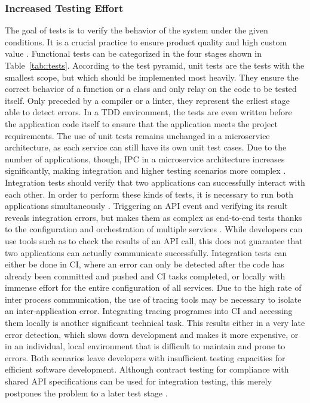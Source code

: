         \subsubsection{Increased Testing Effort}\label{sss::testing_problem}
        The goal of tests is to verify the behavior of the system under the given conditions. It is a crucial practice to ensure product quality and high custom value \cite{azuredevops}. Functional tests can be categorized in the four stages shown in Table~\ref{tab::tests}. According to the test pyramid, unit tests are the tests with the smallest scope, but which should be implemented most heavily. They ensure the correct behavior of a function or a class and only relay on the code to be tested itself. Only preceded by a compiler or a linter, they represent the erliest stage able to detect errors. In a \ac{TDD} environment, the tests are even written before the application code itself to ensure that the application meets the project requirements. The use of unit tests remains unchanged in a microservice architecture, as each service can still have its own unit test cases. Due to the number of applications, though, \ac{IPC} in a microservice architecture increases significantly, making integration and higher testing scenarios more complex \cite{microtest}. \newline
        Integration tests should verify that two applications can successfully interact with each other. In order to perform these kinds of tests, it is necessary to run both applications simultaneously \cite{azuredevops}. Triggering an \ac{API} event and verifying its result reveals integration errors, but makes them as complex as end-to-end tests thanks to the configuration and orchestration of multiple services \cite{microtest}. While developers can use tools such as  to check the results of an \ac{API} call, this does not guarantee that two applications can actually communicate successfully. Integration tests can either be done in \ac{CI}, where an error can only be detected after the code has already been committed and pushed and \ac{CI} tasks completed, or locally with immense effort for the entire configuration of all services. Due to the high rate of inter process communication, the use of tracing tools may be necessary to isolate an inter-application error. Integrating tracing programes into \ac{CI} and accessing them locally is another significant technical task. This results either in a very late error detection, which slows down development and makes it more expensive, or in an individual, local environment that is difficult to maintain and prone to errors. Both scenarios leave developers with insufficient testing capacities for efficient software development. Although contract testing for compliance with shared \ac{API} specifications can be used for integration testing, this merely postpones the problem to a later test stage \cite{microtest}.\newline
